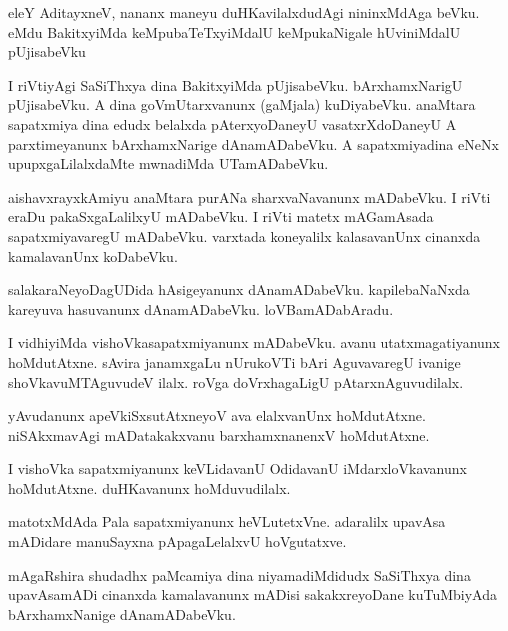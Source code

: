 \documentclass{article}
\begin{document}
\begin{mn}
eleY  AditayxneV,  nananx  maneyu  duHKavilalxdudAgi  nininxMdAga  beVku.  eMdu  BakitxyiMda  
keMpubaTeTxyiMdalU  keMpukaNigale  hUviniMdalU  pUjisabeVku
\end{mn}

\begin{mn}
I riVtiyAgi  SaSiThxya  dina  BakitxyiMda  pUjisabeVku.  bArxhamxNarigU  pUjisabeVku.  
A  dina  goVmUtarxvanunx (gaMjala) kuDiyabeVku.  anaMtara  sapatxmiya  dina  edudx  
belalxda  pAterxyoDaneyU  vasatxrXdoDaneyU  A  parxtimeyanunx  bArxhamxNarige  
dAnamADabeVku.  A  sapatxmiyadina  eNeNx  upupxgaLilalxdaMte  mwnadiMda  UTamADabeVku.
\end{mn}

\begin{mn}
aishavxrayxkAmiyu  anaMtara  purANa sharxvaNavanunx  mADabeVku.  I riVti  eraDu  
pakaSxgaLalilxyU  mADabeVku.  I riVti  matetx  mAGamAsada  sapatxmiyavaregU  
mADabeVku.  varxtada  koneyalilx  kalasavanUnx  cinanxda  kamalavanUnx  koDabeVku.
\end{mn}

\begin{mn}
salakaraNeyoDagUDida  hAsigeyanunx  dAnamADabeVku.  kapilebaNaNxda  kareyuva  
hasuvanunx  dAnamADabeVku.  loVBamADabAradu. 
\end{mn}

\begin{mn}
I  vidhiyiMda  vishoVkasapatxmiyanunx  mADabeVku.  avanu  utatxmagatiyanunx  
hoMdutAtxne.  sAvira  janamxgaLu  nUrukoVTi  bAri  AguvavaregU  ivanige  
shoVkavuMTAguvudeV  ilalx.  roVga  doVrxhagaLigU  pAtarxnAguvudilalx.
\end{mn}

\begin{mn}
yAvudanunx  apeVkiSxsutAtxneyoV  ava elalxvanUnx  hoMdutAtxne.  niSAkxmavAgi  
mADatakakxvanu  barxhamxnanenxV  hoMdutAtxne.
\end{mn}

\begin{mn}
I  vishoVka sapatxmiyanunx  keVLidavanU  OdidavanU  iMdarxloVkavanunx  hoMdutAtxne.  
duHKavanunx  hoMduvudilalx.
\end{mn}

\begin{mn}
matotxMdAda  Pala sapatxmiyanunx  heVLutetxVne.  adaralilx  upavAsa mADidare  manuSayxna  
pApagaLelalxvU  hoVgutatxve.
\end{mn}

\begin{mn}
mAgaRshira  shudadhx  paMcamiya  dina  niyamadiMdidudx  SaSiThxya  dina  upavAsamADi  
cinanxda  kamalavanunx  mADisi sakakxreyoDane  kuTuMbiyAda  bArxhamxNanige  dAnamADabeVku.
\end{mn}
\end{document}
